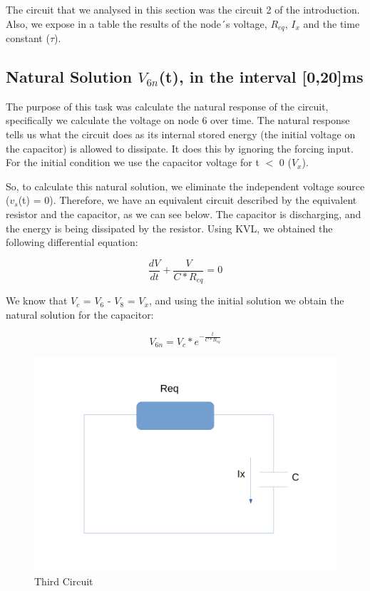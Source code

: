 \par The circuit that we analysed in this section was the circuit 2 of the introduction. Also, we expose in a table the results of the node´s voltage, $R_{eq}$, $I_x$ and the time constant ($\tau$).

 
\subsection{Natural Solution $V_{6n}$(t), in the interval [0,20]ms}

The purpose of this task was calculate the natural response of the circuit, specifically we calculate the voltage on node 6 over time. The natural response tells us what the circuit does as its internal stored energy (the initial voltage on the capacitor) is allowed to dissipate. It does this by ignoring the forcing input. For the initial condition we use the capacitor voltage for t $<$ 0 ($V_x$). 

\par So, to calculate this natural solution, we eliminate the independent voltage source ($v_s$(t) = 0). Therefore, we have an equivalent circuit described by the equivalent resistor and the capacitor, as we can see below. The capacitor is discharging, and the energy is being dissipated by the resistor. Using KVL, we obtained the following differential equation:


\begin{equation}
    \frac{dV}{dt} + \frac{V}{C*R_{eq}} = 0
\end{equation}

\par We know that $V_c$ = $V_6$ - $V_8$ = $V_x$, and using the initial solution we obtain the natural solution for the capacitor:

\begin{equation}
    V_{6n} = V_{c}*e^{-\frac{t}{C*R_{eq}}}
\end{equation}

\begin{figure}[!h] \centering
\includegraphics[width=0.5\linewidth]{Circuito3.pdf}
\caption{Third Circuit}
\label{fig:snat}
\end{figure}

